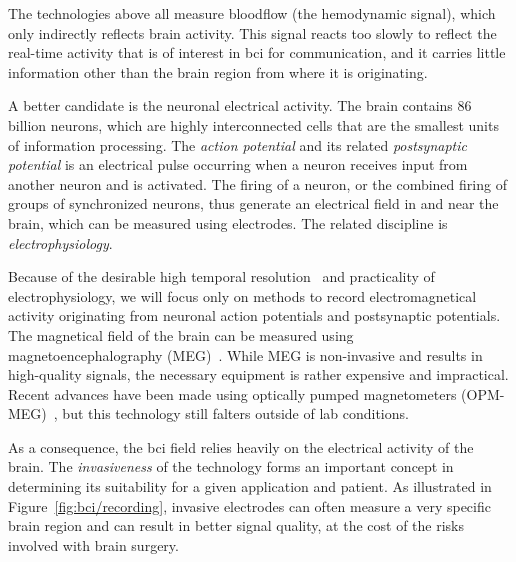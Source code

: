 The technologies above all measure bloodflow (the hemodynamic signal), which only indirectly
reflects brain activity.
This signal reacts too slowly to reflect the real-time activity that is
of interest in \ac{bci} for communication, and it carries little information
other than the brain region from where it is originating.

A better candidate is the neuronal electrical activity.
The brain contains 86 billion neurons, which are highly interconnected cells that are
the smallest units of information processing.
The \emph{action potential} and its related \emph{postsynaptic potential}
is an electrical pulse occurring when a neuron receives
input from another neuron and is activated.
The firing of a neuron, or the combined firing of groups of
synchronized neurons, thus generate an electrical field in and near the brain,
which can be measured using electrodes.
The related discipline is \emph{electrophysiology}.

Because of the desirable high temporal resolution~\cite{Easttom2021} and
practicality of electrophysiology, we will focus only on methods to record
electromagnetical activity originating from neuronal action potentials and
postsynaptic potentials.
The magnetical field of the brain can be measured using magnetoencephalography
(MEG)~\cite{Mellinger2007}.
While MEG is non-invasive and results in high-quality signals, the necessary
equipment is rather expensive and impractical.
Recent advances have been made using optically pumped magnetometers
(OPM-MEG)~\cite{Wittevrongel2021}, but this technology still falters outside of
lab conditions.

As a consequence, the \ac{bci} field relies heavily on the
electrical activity of the brain.
The \emph{invasiveness} of the technology forms an
important concept in determining its suitability for a given application and
patient.
As illustrated in Figure~\ref{fig:bci/recording}, invasive electrodes can often
measure a very specific brain region and can result in better signal quality, at the cost of the risks
involved with brain surgery.

